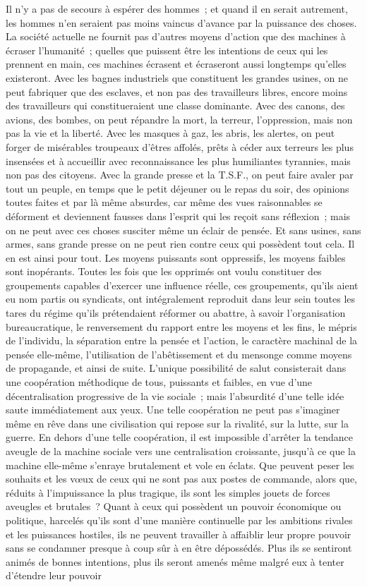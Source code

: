 \documentclass[french,twoside]{book} %
\begin{document}
Il n'y a pas de secours à espérer des hommes ; et quand il en serait autrement, les hommes n'en seraient pas moins vaincus d'avance par la puissance des choses. La société actuelle ne fournit pas d'autres moyens d'action que des machines à écraser l'humanité ; quelles que puissent être les intentions de ceux qui les prennent en main, ces machines écrasent et écraseront aussi longtemps qu'elles existeront. Avec les bagnes industriels que constituent les grandes usines, on ne peut fabriquer que des esclaves, et non pas des travailleurs libres, encore moins des travailleurs qui constitueraient une classe dominante. Avec des canons, des avions, des bombes, on peut répandre la mort, la terreur, l'oppression, mais non pas la vie et la liberté. Avec les masques à gaz, les abris, les alertes, on peut forger de misérables troupeaux d'êtres affolés, prêts à céder aux terreurs les plus insensées et à accueillir avec reconnaissance les plus humiliantes tyrannies, mais non pas des citoyens. Avec la grande presse et la T.S.F., on peut faire avaler par tout un peuple, en temps que le petit déjeuner ou le repas du soir, des opinions toutes faites et par là même absurdes, car même des vues raisonnables se déforment et deviennent fausses dans l'esprit qui les reçoit sans réflexion ; mais on ne peut avec ces choses susciter même un éclair de pensée. Et sans usines, sans armes, sans grande presse on ne peut rien contre ceux qui possèdent tout cela. Il en est ainsi pour tout. Les moyens puissants sont oppressifs, les moyens faibles sont inopérants. Toutes les fois que les opprimés ont voulu constituer des groupements capables d'exercer une influence réelle, ces groupements, qu'ils aient eu nom partis ou syndicats, ont intégralement reproduit dans leur sein toutes les tares du régime qu'ils prétendaient réformer ou abattre, à savoir l'organisation bureaucratique, le renversement du rapport entre les moyens et les fins, le mépris de l'individu, la séparation entre la pensée et l'action, le caractère machinal de la pensée elle-même, l'utilisation de l'abêtissement et du mensonge comme moyens de propagande, et ainsi de suite. L'unique possibilité de salut consisterait dans une coopération méthodique de tous, puissants et faibles, en vue d'une décentralisation progressive de la vie sociale ; mais l'absurdité d'une telle idée saute immédiatement aux yeux. Une telle coopération ne peut pas s'imaginer même en rêve dans une civilisation qui repose sur la rivalité, sur la lutte, sur la guerre. En dehors d'une telle coopération, il est impossible d'arrêter la tendance aveugle de la machine sociale vers une centralisation croissante, jusqu'à ce que la machine elle-même s'enraye brutalement et vole en éclats. Que peuvent peser les souhaits et les vœux de ceux qui ne sont pas aux postes de commande, alors que, réduits à l'impuissance la plus tragique, ils sont les simples jouets de forces aveugles et brutales ? Quant à ceux qui possèdent un pouvoir économique ou politique, harcelés qu'ils sont d'une manière continuelle par les ambitions rivales et les puissances hostiles, ils ne peuvent travailler à affaiblir leur propre pouvoir sans se condamner presque à coup sûr à en être dépossédés. Plus ils se sentiront animés de bonnes intentions, plus ils seront amenés même malgré eux à tenter d'étendre leur pouvoir 
\end{document}
